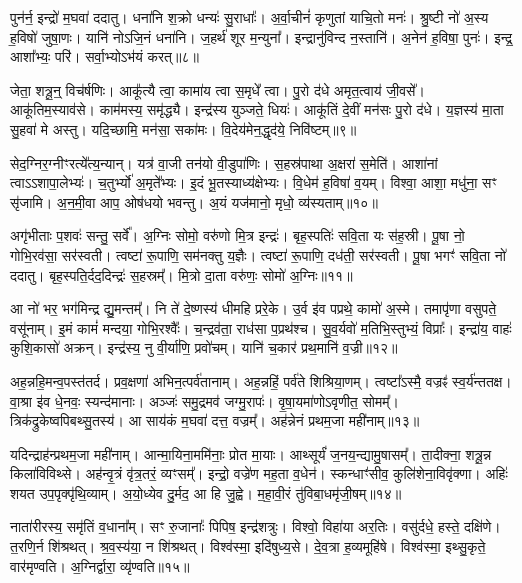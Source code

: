 पुन॑र्न॒ इन्द्रो॑ म॒घवा॑ ददातु।
धना॑नि श॒क्रो धन्यः॑ सु॒राधाः᳚।
अ॒र्वा॒चीनं॑ कृणुतां याचि॒तो मनः॑।
श्रु॒ष्टी नो॑ अ॒स्य ह॒विषो॑ जुषा॒णः।
यानि॑ नोऽजि॒नं धना॑नि।
ज॒हर्थ॑ शूर म॒न्युना᳚।
इन्द्रानु॑विन्द न॒स्तानि॑।
अ॒नेन॑ ह॒विषा॒ पुनः॑।
इन्द्र॒ आशा᳚भ्यः॒ परि॑।
सर्वा॒भ्यो\-ऽभ॑यं करत्॥८॥

जेता॒ शत्रू॒न्॒ विच॑र्\mbox{}षणिः।
आकू᳚त्यै त्वा॒ कामा॑य त्वा स॒मृधे᳚ त्वा।
पु॒रो द॑धे अमृत॒त्वाय॑ जी॒वसे᳚।
आकू॑तिम॒स्याव॑से।
काम॑मस्य॒ समृ॑द्ध्यै।
इन्द्र॑स्य युञ्जते॒ धियः॑।
आकू॑तिं दे॒वीं मन॑सः पु॒रो द॑धे।
य॒ज्ञस्य॑ मा॒ता सु॒हवा॑ मे अस्तु।
यदि॒च्छामि॒ मन॑सा॒ सका॑मः।
वि॒देय॑मेन॒द्धृद॑ये॒ निवि॑ष्टम्॥९॥

सेद॒ग्निर॒ग्नीꣳरत्ये᳚त्य॒न्यान्।
यत्र॑ वा॒जी तन॑यो वी॒डुपा॑णिः।
स॒हस्र॑पाथा अ॒क्षरा॑ स॒मेति॑।
आशा॑नां त्वा\-ऽऽशापा॒लेभ्यः॑।
च॒तुर्भ्यो॑ अ॒मृते᳚भ्यः।
इ॒दं भू॒तस्याध्य॑क्षेभ्यः।
वि॒धेम॑ ह॒विषा॑ व॒यम्।
विश्वा॒ आशा॒ मधु॑ना॒ सꣳ सृ॑जामि।
अ॒न॒मी॒वा आप॒ ओष॑धयो भवन्तु।
अ॒यं यज॑मानो॒ मृधो॒ व्य॑स्यताम्॥१०॥

अगृ॑भीताः प॒शवः॑ सन्तु॒ सर्वे᳚।
अ॒ग्निः सोमो॒ वरु॑णो मि॒त्र इन्द्रः॑।
बृह॒स्पतिः॑ सवि॒ता यः स॑ह॒स्री।
पू॒षा नो॒ गोभि॒रव॑सा॒ सर॑स्वती।
त्वष्टा॑ रू॒पाणि॒ सम॑नक्तु य॒ज्ञैः।
त्वष्टा॑ रू॒पाणि॒ दध॑ती॒ सर॑स्वती।
पू॒षा भगꣳ॑ सवि॒ता नो॑ ददातु।
बृह॒स्पति॒र्दद॒दिन्द्रः॑ स॒हस्रम्᳚।
मि॒त्रो दा॒ता वरु॑णः॒ सोमो॑ अ॒ग्निः॥११॥\anuvakamend[क॒र॒न्निवि॑ष्टमस्यता॒न्नव॑ च]

आ नो॑ भर॒ भग॑मिन्द्र द्यु॒मन्तम्᳚।
नि ते॑ दे॒ष्णस्य॑ धीमहि प्ररे॒के।
उ॒र्व इ॑व पप्रथे॒ कामो॑ अ॒स्मे।
तमापृ॑णा वसुपते॒ वसू॑नाम्।
इ॒मं कामं॑ मन्दया॒ गोभि॒रश्वैः᳚।
च॒न्द्रव॑ता॒ राध॑सा प॒प्रथ॑श्च।
सु॒व॒र्यवो॑ म॒तिभि॒स्तुभ्यं॒ विप्राः᳚।
इन्द्रा॑य॒ वाहः॑ कुशि॒कासो॑ अक्रन्।
इन्द्र॑स्य॒ नु वी॒र्या॑णि॒ प्रवो॑चम्।
यानि॑ च॒कार॑ प्रथ॒मानि॑ व॒ज्री॥१२॥

अह॒न्नहि॒मन्व॒पस्त॑तर्द।
प्रव॒क्षणा॑ अभिन॒त्पर्व॑तानाम्।
अह॒न्नहिं॒ पर्व॑ते शिश्रिया॒णम्।
त्वष्टा᳚\-ऽस्मै॒ वज्रꣴ॑ स्व॒र्य॑न्ततक्ष।
वा॒श्रा इ॑व धे॒नवः॒ स्यन्द॑मानाः।
अञ्जः॑ समु॒द्रमव॑ जग्मु॒रापः॑।
वृ॒षा॒यमा॑णो\-ऽवृणीत॒ सोमम्᳚।
त्रिक॑द्रुकेष्वपिबथ्सु॒तस्य॑।
आ साय॑कं म॒घवा॑ दत्त॒ वज्रम्᳚।
अह॑न्नेनं प्रथम॒जा मही॑नाम्॥१३॥

यदिन्द्राह॑न्प्रथम॒जा मही॑नाम्।
आन्मा॒यिना॒ममि॑नाः॒ प्रोत मा॒याः।
आथ्सूर्यं॑ ज॒नय॒न्द्यामु॒षासम्᳚।
ता॒दीक्ना॒ शत्रू॒न्न किला॑विविथ्से।
अह॑न्वृ॒त्रं वृ॑त्र॒तरं॒ व्यꣳसम्᳚।
इन्द्रो॒ वज्रे॑ण मह॒ता व॒धेन॑।
स्कन्धाꣳ॑सीव॒ कुलि॑शेना॒विवृ॑क्णा।
अहिः॑ शयत उप॒पृक्पृ॑थि॒व्याम्।
अ॒यो॒ध्येव दु॒र्मद॒ आ हि जु॒ह्वे।
म॒हा॒वी॒रं तु॑विबा॒धमृ॑जी॒षम्॥१४॥

नाता॑रीरस्य॒ समृ॑तिं व॒धाना᳚म्।
सꣳ रु॒जानाः᳚ पिपिष॒ इन्द्र॑शत्रुः।
विश्वो॒ विहा॑या अर॒तिः।
वसु॑र्दधे॒ हस्ते॒ दक्षि॑णे।
त॒रणि॒र्न शि॑श्रथत्।
श्र॒व॒स्य॑या॒ न शि॑श्रथत्।
विश्व॑स्मा॒ इदि॑षुध्य॒से।
दे॒व॒त्रा ह॒व्यमूहि॑षे।
विश्व॑स्मा॒ इथ्सु॒कृते॒ वार॑मृण्वति।
अ॒ग्निर्द्वारा॒ व्यृ॑ण्वति॥१५॥


